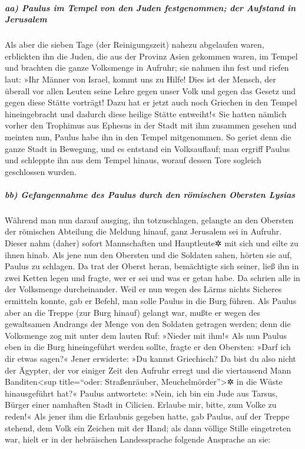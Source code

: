 \hypertarget{aa-paulus-im-tempel-von-den-juden-festgenommen-der-aufstand-in-jerusalem}{%
\subparagraph{aa) Paulus im Tempel von den Juden festgenommen; der
Aufstand in
Jerusalem}\label{aa-paulus-im-tempel-von-den-juden-festgenommen-der-aufstand-in-jerusalem}}

 Als aber die sieben Tage (der Reinigungszeit) nahezu
abgelaufen waren, erblickten ihn die Juden, die aus der Provinz Asien
gekommen waren, im Tempel und brachten die ganze Volksmenge in Aufruhr;
sie nahmen ihn fest  und riefen laut: »Ihr Männer von
Israel, kommt uns zu Hilfe! Dies ist der Mensch, der überall vor allen
Leuten seine Lehre gegen unser Volk und gegen das Gesetz und gegen diese
Stätte vorträgt! Dazu hat er jetzt auch noch Griechen in den Tempel
hineingebracht und dadurch diese heilige Stätte entweiht!«
 Sie hatten nämlich vorher den Trophimus aus Ephesus in
der Stadt mit ihm zusammen gesehen und meinten nun, Paulus habe ihn in
den Tempel mitgenommen.  So geriet denn die ganze Stadt
in Bewegung, und es entstand ein Volksauflauf; man ergriff Paulus und
schleppte ihn aus dem Tempel hinaus, worauf dessen Tore sogleich
geschlossen wurden.

\hypertarget{bb-gefangennahme-des-paulus-durch-den-ruxf6mischen-obersten-lysias}{%
\subparagraph{bb) Gefangennahme des Paulus durch den römischen Obersten
Lysias}\label{bb-gefangennahme-des-paulus-durch-den-ruxf6mischen-obersten-lysias}}

 Während man nun darauf ausging, ihn totzuschlagen,
gelangte an den Obersten der römischen Abteilung die Meldung hinauf,
ganz Jerusalem sei in Aufruhr.  Dieser nahm (daher)
sofort Mannschaften und Hauptleute✲ mit sich und eilte zu ihnen hinab.
Als jene nun den Obersten und die Soldaten sahen, hörten sie auf, Paulus
zu schlagen.  Da trat der Oberst heran, bemächtigte sich
seiner, ließ ihn in zwei Ketten legen und fragte, wer er sei und was er
getan habe.  Da schrien alle in der Volksmenge
durcheinander. Weil er nun wegen des Lärms nichts Sicheres ermitteln
konnte, gab er Befehl, man solle Paulus in die Burg führen.
 Als Paulus aber an die Treppe (zur Burg hinauf) gelangt
war, mußte er wegen des gewaltsamen Andrangs der Menge von den Soldaten
getragen werden;  denn die Volksmenge zog mit unter dem
lauten Ruf: »Nieder mit ihm!«  Als nun Paulus eben in die
Burg hineingeführt werden sollte, fragte er den Obersten: »Darf ich dir
etwas sagen?« Jener erwiderte: »Du kannst Griechisch?  Da
bist du also nicht der Ägypter, der vor einiger Zeit den Aufruhr erregt
und die viertausend Mann Banditen\textless sup title=``oder:
Straßenräuber, Meuchelmörder''\textgreater✲ in die Wüste hinausgeführt
hat?«  Paulus antwortete: »Nein, ich bin ein Jude aus
Tarsus, Bürger einer namhaften Stadt in Cilicien. Erlaube mir, bitte,
zum Volke zu reden!«  Als jener ihm die Erlaubnis gegeben
hatte, gab Paulus, auf der Treppe stehend, dem Volk ein Zeichen mit der
Hand; als dann völlige Stille eingetreten war, hielt er in der
hebräischen Landessprache folgende Ansprache an sie:


